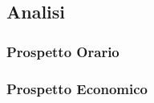 \subsection{Analisi}

\subsubsection{Prospetto Orario}

\subsubsection{Prospetto Economico}

\pagebreak
